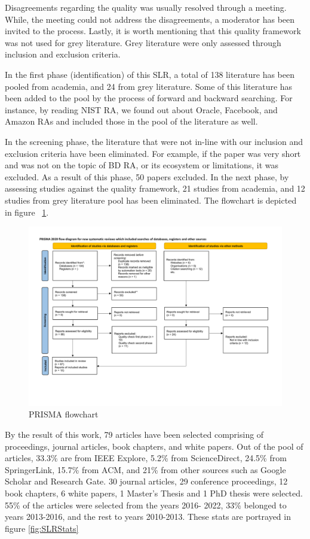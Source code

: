 \documentclass[review]{elsarticle}
\begin{document}
Disagreements regarding the quality was usually resolved through a meeting. While, the meeting could not address the disagreements, a moderator has been invited to the process. Lastly, it is worth mentioning that this quality framework was not used for grey literature. Grey literature were only assessed through inclusion and exclusion criteria. 

In the first phase (identification) of this SLR, a total of 138 literature has been pooled from academia, and 24 from grey literature. Some of this literature has been added to the pool by the process of forward and backward searching. For instance, by reading NIST RA, we found out about Oracle, Facebook, and Amazon RAs and included those in the pool of the literature as well. 

In the screening phase, the literature that were not in-line with our inclusion and exclusion criteria have been eliminated. For example, if the paper was very short and was not on the topic of BD RA, or its ecosystem or limitations, it was excluded. As a result of this phase, 50 papers excluded. In the next phase, by assessing studies against the quality framework, 21 studies from academia, and 12 studies from grey literature pool has been eliminated. The flowchart is depicted in figure ~\ref{fig:PRISMA}.

\begin{figure}[t]
    \includegraphics[width=13cm]{PRISMA/PRISMA_Flow_Diagram-2.pdf}
    \caption{PRISMA flowchart}
    \label{fig:PRISMA}
\end{figure}

By the result of this work, 79 articles have been selected comprising of proceedings, journal articles, book chapters, and white papers. Out of the pool of articles, 33.3\% are from IEEE Explore, 5.2\% from ScienceDirect, 24.5\% from SpringerLink, 15.7\% from ACM, and 21\% from other sources such as Google Scholar and Research Gate. 30 journal articles, 29 conference proceedings, 12 book chapters, 6 white papers, 1 Master’s Thesis and 1 PhD thesis were selected. 55\% of the articles were selected from the years 2016- 2022, 33\% belonged to years 2013-2016, and the rest to years 2010-2013. These stats are portrayed in figure \ref{fig:SLRStats}
\end{document}
